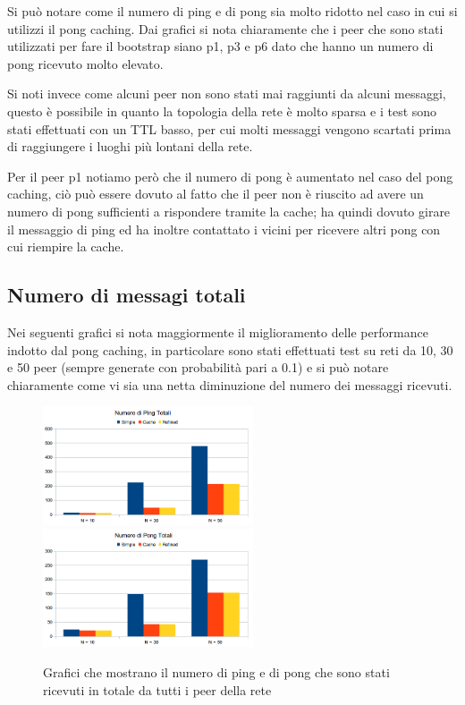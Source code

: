 \documentclass[a4paper,11pt]{article}
\begin{document}
Si pu\`o notare come il numero di ping e di pong sia molto ridotto nel caso in cui si utilizzi il pong caching. Dai grafici si nota chiaramente che i peer che sono stati utilizzati per fare il bootstrap siano p1, p3 e p6 dato che hanno un numero di pong ricevuto molto elevato.

Si noti invece come alcuni peer non sono stati mai raggiunti da alcuni messaggi, questo \`e possibile in quanto la topologia della rete \`e molto sparsa e i test sono stati effettuati con un TTL basso, per cui molti messaggi vengono scartati prima di raggiungere i luoghi pi\`u lontani della rete.

Per il peer \textsf{p1} notiamo per\`o che il numero di pong \`e aumentato nel caso del pong caching, ci\`o pu\`o essere dovuto al fatto che il peer non \`e riuscito ad avere un numero di pong sufficienti a rispondere tramite la cache; ha quindi dovuto girare il messaggio di ping ed ha inoltre contattato i vicini per ricevere altri pong con cui riempire la cache.

\subsection{Numero di messagi totali}

Nei seguenti grafici si nota maggiormente il miglioramento delle performance indotto dal pong caching, in particolare sono stati effettuati test su reti da 10, 30 e 50 peer (sempre generate con probabilit\`a pari a 0.1) e si pu\`o notare chiaramente come vi sia una netta diminuzione del numero dei messaggi ricevuti.

\begin{figure}[ht]
\centering
\includegraphics[height=3.5cm]{graph2ping.png}
\includegraphics[height=3.5cm]{graph2pong.png}
\caption{\small{Grafici che mostrano il numero di ping e di pong che sono stati ricevuti in totale da tutti i peer della rete}}
\end{figure}
\end{document}
